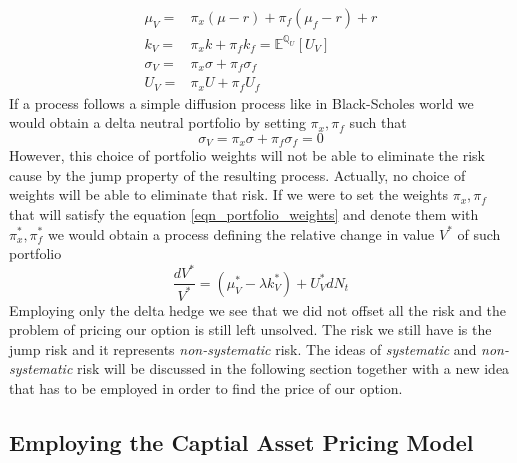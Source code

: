 \documentclass[times, utf8, diplomski]{fer}
\begin{document}
\begin{equation} \label{eqn_portfolio_params}
\begin{split}
	\mu_V =& \pi_x(\mu - r) + \pi_f(\mu_f - r) + r \\
	k_V =& \pi_x k + \pi_f k_f = \mathbb{E}^{\mathbb{Q}_U}[U_V] \\
	\sigma_V =& \pi_x\sigma + \pi_f\sigma_f \\
	U_V =& \pi_x U + \pi_f U_f
\end{split}
\end{equation}
If a process follows a simple diffusion process like in Black-Scholes world we would obtain a delta neutral portfolio by setting $\pi_x, \pi_f$ such that
\begin{equation} \label{eqn_portfolio_weights}
	\sigma_V = \pi_x\sigma + \pi_f\sigma_f = 0
\end{equation}
However, this choice of portfolio weights will not be able to eliminate the risk cause by the jump property of the resulting process. Actually, no choice of weights will be able to eliminate that risk. If we were to set the weights $\pi_x, \pi_f$ that will satisfy the equation \ref{eqn_portfolio_weights} and denote them with $\pi_x^*, \pi_f^*$ we would obtain a process defining the relative change in value $V^*$ of such portfolio
\begin{equation}
	\frac{dV^*}{V^*} = (\mu_V^* - \lambda k_V^*) + U_V^* dN_t
\end{equation}
Employing only the delta hedge we see that we did not offset all the risk and the problem of pricing our option is still left unsolved. The risk we still have is the jump risk and it represents \textit{non-systematic} risk. The ideas of \textit{systematic} and \textit{non-systematic} risk will be discussed in the following section together with a new idea that has to be employed in order to find the price of our option.

\subsection{Employing the Captial Asset Pricing Model}
\end{document}

